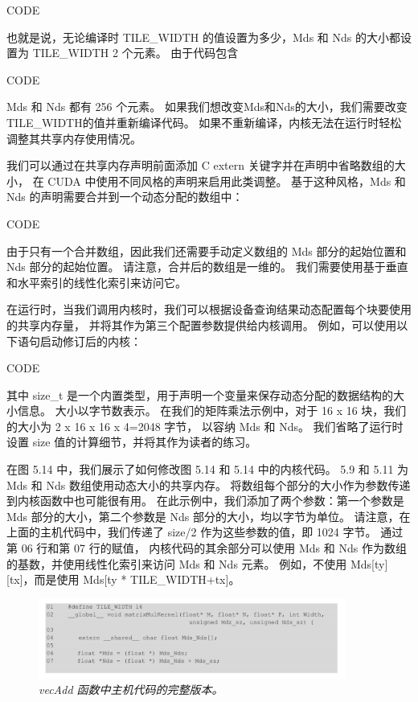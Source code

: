{\color{red} CODE}

也就是说，无论编译时 TILE\_WIDTH 的值设置为多少，Mds 和 Nds 的大小都设置为 TILE\_WIDTH 2 个元素。 由于代码包含

{\color{red} CODE}

Mds 和 Nds 都有 256 个元素。 如果我们想改变Mds和Nds的大小，我们需要改变TILE\_WIDTH的值并重新编译代码。 
如果不重新编译，内核无法在运行时轻松调整其共享内存使用情况。

我们可以通过在共享内存声明前面添加 C extern 关键字并在声明中省略数组的大小，
在 CUDA 中使用不同风格的声明来启用此类调整。 基于这种风格，Mds 和 Nds 的声明需要合并到一个动态分配的数组中：

{\color{red} CODE}

由于只有一个合并数组，因此我们还需要手动定义数组的 Mds 部分的起始位置和 Nds 部分的起始位置。 
请注意，合并后的数组是一维的。 我们需要使用基于垂直和水平索引的线性化索引来访问它。

在运行时，当我们调用内核时，我们可以根据设备查询结果动态配置每个块要使用的共享内存量，
并将其作为第三个配置参数提供给内核调用。 例如，可以使用以下语句启动修订后的内核：

{\color{red} CODE}

其中 size\_t 是一个内置类型，用于声明一个变量来保存动态分配的数据结构的大小信息。 
大小以字节数表示。 在我们的矩阵乘法示例中，对于 16 x 16 块，我们的大小为 2 x 16 x 16 x 4=2048 字节，
以容纳 Mds 和 Nds。 我们省略了运行时设置 size 值的计算细节，并将其作为读者的练习。

在图 5.14 中，我们展示了如何修改图 5.14 和 5.14 中的内核代码。 
5.9 和 5.11 为 Mds 和 Nds 数组使用动态大小的共享内存。 将数组每个部分的大小作为参数传递到内核函数中也可能很有用。 
在此示例中，我们添加了两个参数：第一个参数是 Mds 部分的大小，第二个参数是 Nds 部分的大小，均以字节为单位。 
请注意，在上面的主机代码中，我们传递了 size/2 作为这些参数的值，即 1024 字节。 通过第 06 行和第 07 行的赋值，
内核代码的其余部分可以使用 Mds 和 Nds 作为数组的基数，并使用线性化索引来访问 Mds 和 Nds 元素。 
例如，不使用 Mds[ty][tx]，而是使用 Mds[ty * TILE\_WIDTH+tx]。

\begin{figure}[H]
	\centering
	\includegraphics[width=0.9\textwidth]{figs/F5.14.png}
	\caption{\textit{\color{red} vecAdd 函数中主机代码的完整版本。}}
\end{figure}

